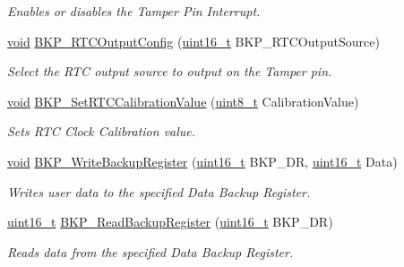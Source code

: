 \begin{DoxyCompactItemize}
\begin{DoxyCompactList}\small\item\em Enables or disables the Tamper Pin Interrupt. \end{DoxyCompactList}\item 
\hyperlink{usb__devapi_8h_afabf60e7f57651d6d595a02c75f07cd0}{void} \hyperlink{group___b_k_p___private___functions_ga3d1b22b3c6a79f7b423616a0af1885bf}{B\+K\+P\+\_\+\+R\+T\+C\+Output\+Config} (\hyperlink{_p_e___types_8h_a1f1825b69244eb3ad2c7165ddc99c956}{uint16\+\_\+t} B\+K\+P\+\_\+\+R\+T\+C\+Output\+Source)
\begin{DoxyCompactList}\small\item\em Select the R\+TC output source to output on the Tamper pin. \end{DoxyCompactList}\item 
\hyperlink{usb__devapi_8h_afabf60e7f57651d6d595a02c75f07cd0}{void} \hyperlink{group___b_k_p___private___functions_gad34db08a944450d2e7d56d0fd8db2bca}{B\+K\+P\+\_\+\+Set\+R\+T\+C\+Calibration\+Value} (\hyperlink{_p_e___types_8h_aba7bc1797add20fe3efdf37ced1182c5}{uint8\+\_\+t} Calibration\+Value)
\begin{DoxyCompactList}\small\item\em Sets R\+TC Clock Calibration value. \end{DoxyCompactList}\item 
\hyperlink{usb__devapi_8h_afabf60e7f57651d6d595a02c75f07cd0}{void} \hyperlink{group___b_k_p___private___functions_ga18d220387db651b3cb71fad5c092e041}{B\+K\+P\+\_\+\+Write\+Backup\+Register} (\hyperlink{_p_e___types_8h_a1f1825b69244eb3ad2c7165ddc99c956}{uint16\+\_\+t} B\+K\+P\+\_\+\+DR, \hyperlink{_p_e___types_8h_a1f1825b69244eb3ad2c7165ddc99c956}{uint16\+\_\+t} Data)
\begin{DoxyCompactList}\small\item\em Writes user data to the specified Data Backup Register. \end{DoxyCompactList}\item 
\hyperlink{_p_e___types_8h_a1f1825b69244eb3ad2c7165ddc99c956}{uint16\+\_\+t} \hyperlink{group___b_k_p___private___functions_ga359d8fbc945e0f4e34fedbe037d842c8}{B\+K\+P\+\_\+\+Read\+Backup\+Register} (\hyperlink{_p_e___types_8h_a1f1825b69244eb3ad2c7165ddc99c956}{uint16\+\_\+t} B\+K\+P\+\_\+\+DR)
\begin{DoxyCompactList}\small\item\em Reads data from the specified Data Backup Register. \end{DoxyCompactList}\item 

\end{DoxyCompactItemize}
